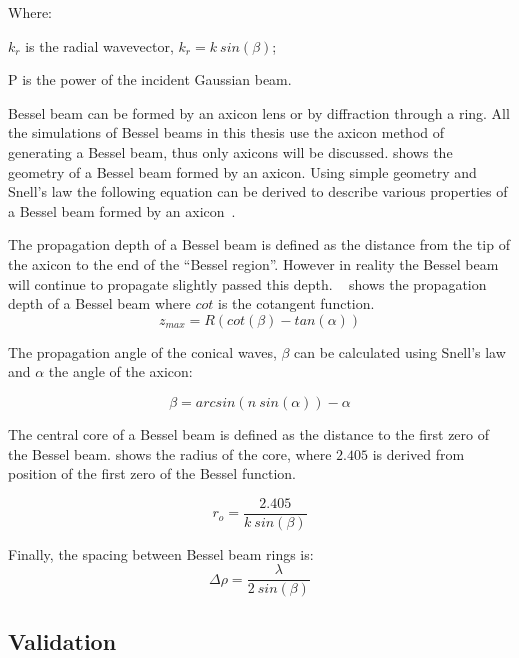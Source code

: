\noindent Where:

    \indent $k_r$ is the radial wavevector, $k_r=k\ sin(\beta)$;

    \indent P is the power of the incident Gaussian beam.

    \medskip

Bessel beam can be formed by an axicon lens or by diffraction through a ring.
All the simulations of Bessel beams in this thesis use the axicon method of generating a Bessel beam, thus only axicons will be discussed.
 shows the geometry of a Bessel beam formed by an axicon.
Using simple geometry and Snell's law the following equation can be derived to describe various properties of a Bessel beam formed by an axicon~\cite{merola2012characterization,}.

The propagation depth of a Bessel beam is defined as the distance from the tip of the axicon to the end of the ``Bessel region''. However in reality the Bessel beam will continue to propagate slightly passed this depth.%
~ shows the propagation depth of a Bessel beam where $cot$ is the cotangent function.
\begin{equation}
z_{max}=R\left(cot\left(\beta\right) - tan\left(\alpha\right)\right)
\label{eqn:besselzmax}
\end{equation}

The propagation angle of the conical waves, $\beta$ can be calculated using Snell's law and $\alpha$ the angle of the axicon:

\begin{equation}
\beta = arcsin\left(n\ sin\left(\alpha\right)\right)-\alpha
\label{eqn:betaangle}
\end{equation}

The central core of a Bessel beam is defined as the distance to the first zero of the Bessel beam.
 shows the radius of the core, where $2.405$ is derived from position of the first zero of the Bessel function.

\begin{equation}
r_o = \frac{2.405}{k\ sin\left(\beta\right)}
\label{eqn:coreradius}
\end{equation}

Finally, the spacing between Bessel beam rings is:
\begin{equation}
\Delta \rho = \frac{\lambda}{2\ sin\left(\beta\right)}
\end{equation}

\subsection{Validation}

